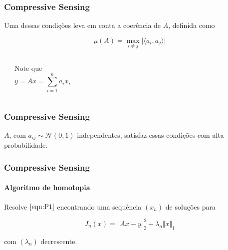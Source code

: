 \documentclass[11pt]{beamer}
\begin{document}
\begin{frame}
\frametitle{Compressive Sensing}
Uma dessas condições leva em conta a coerência de $A$, definida como

$$\mu(A) = \max_{i \neq j} \vert \langle a_i, a_j \rangle \vert$$

\begin{center}
\begin{columns}[t]
\vspace{.5cm}
\begin{center}
\end{center}
\begin{center}
Note que
$$y = Ax = \sum_{i = 1}^n a_i x_i$$
\end{center}
\end{columns}
\end{center}

\end{frame}

\begin{frame}
\frametitle{Compressive Sensing}
$A$, com $a_{ij} \sim \mathcal{N}(0,1)$ independentes, satisfaz essas condições com alta probabilidade.
\end{frame}

\begin{frame}
\frametitle{Compressive Sensing}
\framesubtitle{Algoritmo de homotopia}
Resolve $\eqref{eqn:P1}$ encontrando uma sequência $(x_n)$ de soluções para

$$J_n(x) = \Vert Ax - y \Vert_2^2 + \lambda_n \Vert x \Vert_1$$

com $(\lambda_n)$ decrescente.
\end{frame}
\end{document}
